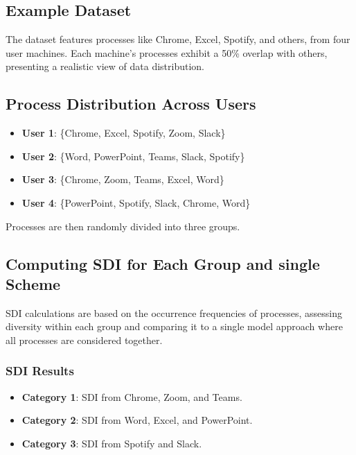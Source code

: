 \subsection*{Example Dataset}

The dataset features processes like Chrome, Excel, Spotify, and others, from four user machines. Each machine's processes exhibit a 50\% overlap with others, presenting a realistic view of data distribution.

\subsection*{Process Distribution Across Users}

\begin{itemize}
    \item \textbf{User 1}: \{Chrome, Excel, Spotify, Zoom, Slack\}
    \item \textbf{User 2}: \{Word, PowerPoint, Teams, Slack, Spotify\}
    \item \textbf{User 3}: \{Chrome, Zoom, Teams, Excel, Word\}
    \item \textbf{User 4}: \{PowerPoint, Spotify, Slack, Chrome, Word\}
\end{itemize}

Processes are then randomly divided into three groups.

\subsection*{Computing SDI for Each Group and single  Scheme}

SDI calculations are based on the occurrence frequencies of processes, assessing diversity within each group and comparing it to a single  model approach where all processes are considered together.

\subsubsection*{SDI Results}

\begin{itemize}
    \item \textbf{Category 1}: SDI from Chrome, Zoom, and Teams.
    \item \textbf{Category 2}: SDI from Word, Excel, and PowerPoint.
    \item \textbf{Category 3}: SDI from Spotify and Slack.
\end{itemize}

